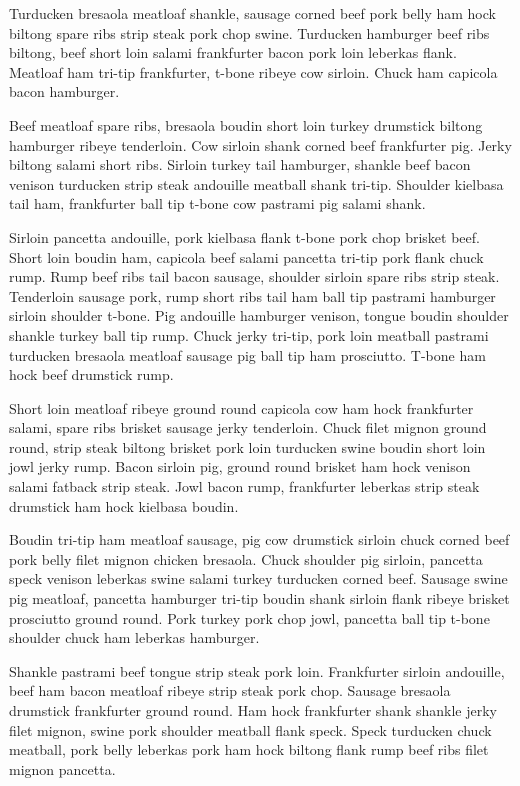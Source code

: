 Turducken bresaola meatloaf shankle, sausage corned beef pork belly ham hock biltong spare ribs strip steak pork chop swine. Turducken hamburger beef ribs biltong, beef short loin salami frankfurter bacon pork loin leberkas flank. Meatloaf ham tri-tip frankfurter, t-bone ribeye cow sirloin. Chuck ham capicola bacon hamburger.

Beef meatloaf spare ribs, bresaola boudin short loin turkey drumstick biltong hamburger ribeye tenderloin. Cow sirloin shank corned beef frankfurter pig. Jerky biltong salami short ribs. Sirloin turkey tail hamburger, shankle beef bacon venison turducken strip steak andouille meatball shank tri-tip. Shoulder kielbasa tail ham, frankfurter ball tip t-bone cow pastrami pig salami shank.

Sirloin pancetta andouille, pork kielbasa flank t-bone pork chop brisket beef. Short loin boudin ham, capicola beef salami pancetta tri-tip pork flank chuck rump. Rump beef ribs tail bacon sausage, shoulder sirloin spare ribs strip steak. Tenderloin sausage pork, rump short ribs tail ham ball tip pastrami hamburger sirloin shoulder t-bone. Pig andouille hamburger venison, tongue boudin shoulder shankle turkey ball tip rump. Chuck jerky tri-tip, pork loin meatball pastrami turducken bresaola meatloaf sausage pig ball tip ham prosciutto. T-bone ham hock beef drumstick rump.

Short loin meatloaf ribeye ground round capicola cow ham hock frankfurter salami, spare ribs brisket sausage jerky tenderloin. Chuck filet mignon ground round, strip steak biltong brisket pork loin turducken swine boudin short loin jowl jerky rump. Bacon sirloin pig, ground round brisket ham hock venison salami fatback strip steak. Jowl bacon rump, frankfurter leberkas strip steak drumstick ham hock kielbasa boudin.

Boudin tri-tip ham meatloaf sausage, pig cow drumstick sirloin chuck corned beef pork belly filet mignon chicken bresaola. Chuck shoulder pig sirloin, pancetta speck venison leberkas swine salami turkey turducken corned beef. Sausage swine pig meatloaf, pancetta hamburger tri-tip boudin shank sirloin flank ribeye brisket prosciutto ground round. Pork turkey pork chop jowl, pancetta ball tip t-bone shoulder chuck ham leberkas hamburger.

Shankle pastrami beef tongue strip steak pork loin. Frankfurter sirloin andouille, beef ham bacon meatloaf ribeye strip steak pork chop. Sausage bresaola drumstick frankfurter ground round. Ham hock frankfurter shank shankle jerky filet mignon, swine pork shoulder meatball flank speck. Speck turducken chuck meatball, pork belly leberkas pork ham hock biltong flank rump beef ribs filet mignon pancetta.

